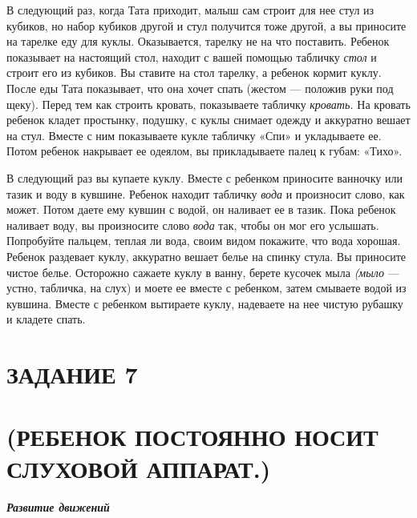 \documentclass[a5paper]{book}
\renewcommand{\emph}[1]{\textit{#1}}
\begin{document}
В следующий раз, когда Тата приходит, малыш сам строит для нее стул из
кубиков, но набор кубиков другой и стул получится тоже другой, а вы
приносите на тарелке еду для куклы. Оказывается, тарелку не на что
поставить. Ребенок показывает на настоящий стол, находит с вашей помощью
табличку \emph{стол} и строит его из кубиков. Вы ставите на стол
тарелку, а ребенок кормит куклу. После еды Тата показывает, что она
хочет спать (жестом --- положив руки под щеку). Перед тем как строить
кровать, показываете табличку \emph{кровать.} На кровать ребенок кладет
простынку, подушку, с куклы снимает одежду и аккуратно вешает на стул.
Вместе с ним показываете кукле табличку «Спи» и укладываете ее. Потом
ребенок накрывает ее одеялом, вы прикладываете палец к губам: «Тихо».

В следующий раз вы купаете куклу. Вместе с ребенком приносите ванночку
или тазик и воду в кувшине. Ребенок находит табличку \emph{вода} и
произносит слово, как может. Потом даете ему кувшин с водой, он наливает
ее в тазик. Пока ребенок наливает воду, вы произносите слово \emph{вода}
так, чтобы он мог его услышать. Попробуйте пальцем, теплая ли вода,
своим видом покажите, что вода хорошая. Ребенок раздевает куклу,
аккуратно вешает белье на спинку стула. Вы приносите чистое белье.
Осторожно сажаете куклу в ванну, берете кусочек мыла \emph{(мыло} ---
устно, табличка, на слух) и моете ее вместе с ребенком, затем смываете
водой из кувшина. Вместе с ребенком вытираете куклу, надеваете на нее
чистую рубашку и кладете спать.

\section{ЗАДАНИЕ 7}\section*{(РЕБЕНОК ПОСТОЯННО НОСИТ СЛУХОВОЙ АППАРАТ.)}

\emph{\textbf{Развитие движений}}
\end{document}

